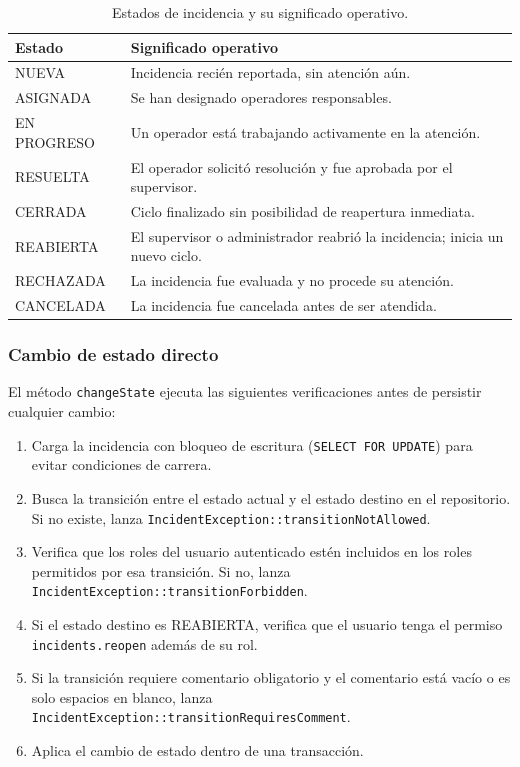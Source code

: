 \documentclass[12pt,a4paper]{article}
\begin{document}
\begin{table}[H]
\centering
\small
{}
\begin{tabularx}{\textwidth}{@{}p{} X@{}}
\toprule
\textbf{Estado} & \textbf{Significado operativo} \\
\midrule
NUEVA & Incidencia recién reportada, sin atención aún. \\
ASIGNADA & Se han designado operadores responsables. \\
EN PROGRESO & Un operador está trabajando activamente en la atención. \\
RESUELTA & El operador solicitó resolución y fue aprobada por el supervisor. \\
CERRADA & Ciclo finalizado sin posibilidad de reapertura inmediata. \\
REABIERTA & El supervisor o administrador reabrió la incidencia; inicia un nuevo ciclo. \\
RECHAZADA & La incidencia fue evaluada y no procede su atención. \\
CANCELADA & La incidencia fue cancelada antes de ser atendida. \\
\bottomrule
\end{tabularx}
\caption{Estados de incidencia y su significado operativo.}
\end{table}

\subsubsection*{Cambio de estado directo}

El método \texttt{changeState} ejecuta las siguientes verificaciones antes de
persistir cualquier cambio:
\begin{enumerate}
    \item Carga la incidencia con bloqueo de escritura (\texttt{SELECT FOR UPDATE})
          para evitar condiciones de carrera.
    \item Busca la transición entre el estado actual y el estado destino en el
          repositorio. Si no existe, lanza \texttt{IncidentException::transitionNotAllowed}.
    \item Verifica que los roles del usuario autenticado estén incluidos en los
          roles permitidos por esa transición. Si no, lanza
          \texttt{IncidentException::transitionForbidden}.
    \item Si el estado destino es REABIERTA, verifica que el usuario tenga el
          permiso \texttt{incidents.reopen} además de su rol.
    \item Si la transición requiere comentario obligatorio y el comentario está
          vacío o es solo espacios en blanco, lanza
          \texttt{IncidentException::transitionRequiresComment}.
    \item Aplica el cambio de estado dentro de una transacción.
\end{enumerate}
\end{document}
